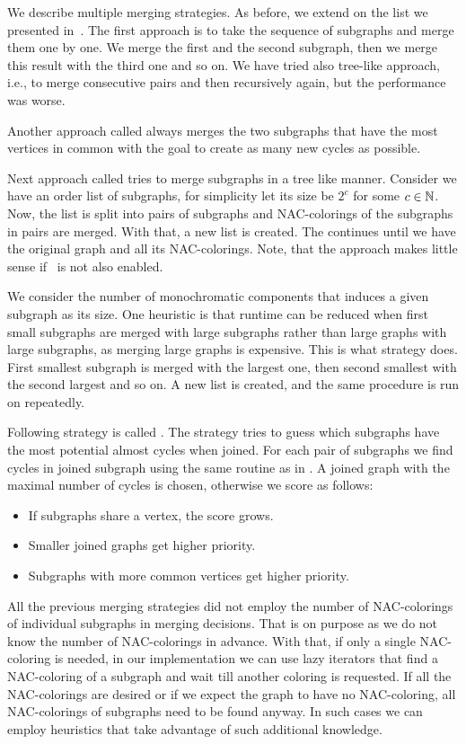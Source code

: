 We describe multiple merging strategies.
As before, we extend on the list we presented in~\cite{my_paper}.
The first approach \MergeLinear{} is
to take the sequence of subgraphs and merge them one by one.
We merge the first and the second subgraph, then we merge this result with the
third one and so on. We have tried also tree-like approach, i.e., to merge consecutive pairs
and then recursively again, but the performance was worse.

Another approach called \SharedVertices{} always merges the two subgraphs that
have the most vertices in common with the goal
to create as many new cycles as possible.

Next approach called \Log{} tries to merge subgraphs in a tree like manner.
Consider we have an order list of subgraphs,
for simplicity let its size be \( 2^c \) for some \( c \in \mathbb{N} \).
Now, the list is split into pairs of subgraphs and NAC-colorings
of the subgraphs in pairs are merged. With that, a new list is created.
The continues until we have the original graph and all its NAC-colorings.
Note, that the approach makes little sense if~
is not also enabled.

We consider the number of monochromatic components
that induces a given subgraph as its size.
One heuristic is that runtime can be reduced
when first small subgraphs are merged with large subgraphs
rather than large graphs with large subgraphs, as merging large graphs is expensive.
This is what \MinMax{} strategy does.
First smallest subgraph is merged with the largest one,
then second smallest with the second largest and so on.
A new list is created, and the same procedure is run on repeatedly.

Following strategy is called \PromisingCycles{}.
The strategy tries to guess which subgraphs
have the most potential almost cycles when joined.
For each pair of subgraphs we find cycles in joined subgraph using
the same routine as in .
A joined graph with the maximal number of cycles is chosen,
otherwise we score as follows:
%
\begin{itemize}
	\item If subgraphs share a vertex, the score grows.
	\item Smaller joined graphs get higher priority.
	\item Subgraphs with more common vertices get higher priority.
\end{itemize}
%

All the previous merging strategies did not employ the number of NAC-colorings
of individual subgraphs in merging decisions.
That is on purpose as we do not know the number of NAC-colorings in advance.
With that, if only a single NAC-coloring is needed,
in our implementation we can use lazy iterators that
find a NAC-coloring of a subgraph and wait till another coloring is requested.
If all the NAC-colorings are desired or if we expect the graph to have no NAC-coloring,
all NAC-colorings of subgraphs need to be found anyway.
In such cases we can employ heuristics that take advantage of such additional knowledge.

